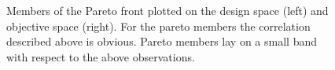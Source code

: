 \begin{figure}[h!]
\begin{minipage}[b]{0.5\linewidth}
 \centering
\end{minipage}
\begin{minipage}[b]{0.5\linewidth}
 \centering
\end{minipage}
\caption{Members of the Pareto front plotted on the design space (left) and objective space (right). For the pareto members the correlation described above is obvious.  Pareto members lay on a small band with respect to the above observations.}
\label{pareto_DOFs}
\end{figure}

